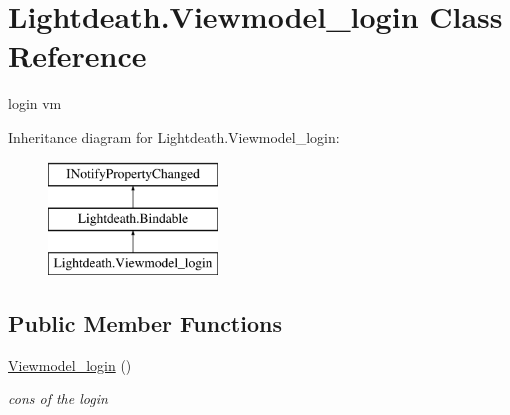 \hypertarget{class_lightdeath_1_1_viewmodel__login}{}\section{Lightdeath.\+Viewmodel\+\_\+login Class Reference}
\label{class_lightdeath_1_1_viewmodel__login}


login vm  


Inheritance diagram for Lightdeath.\+Viewmodel\+\_\+login\+:\begin{figure}[H]
\begin{center}
\leavevmode
\includegraphics[height=3.000000cm]{class_lightdeath_1_1_viewmodel__login}
\end{center}
\end{figure}
\subsection*{Public Member Functions}
\begin{DoxyCompactItemize}
\item 
\hyperlink{class_lightdeath_1_1_viewmodel__login_a6e77485ee5cc5fce15ee6aaaa742bf7f}{Viewmodel\+\_\+login} ()
\begin{DoxyCompactList}\small\item\em cons of the login \end{DoxyCompactList}\end{DoxyCompactItemize}
